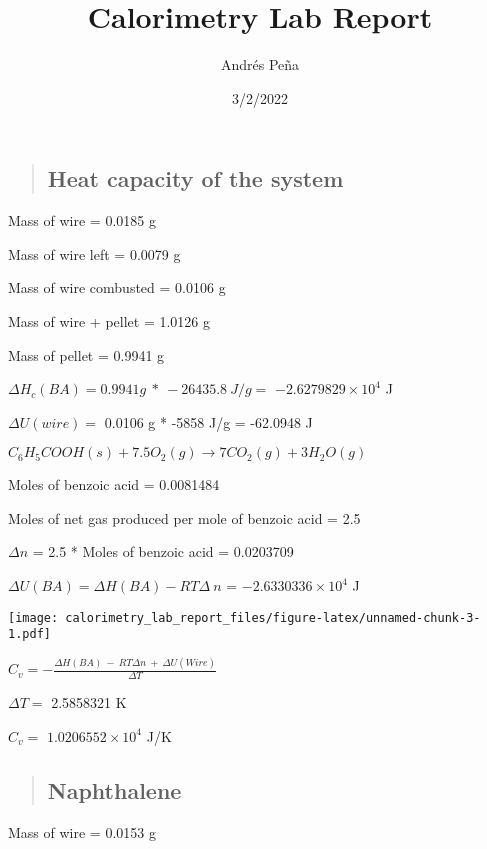 \documentclass[
]{article}
\title{Calorimetry Lab Report}
\author{Andrés Peña}
\date{3/2/2022}
\begin{document}
\maketitle

\begin{quote}
\hypertarget{heat-capacity-of-the-system}{%
\subsection{Heat capacity of the
system}\label{heat-capacity-of-the-system}}
\end{quote}

Mass of wire = 0.0185 g

Mass of wire left = 0.0079 g

Mass of wire combusted = 0.0106 g

Mass of wire + pellet = 1.0126 g

Mass of pellet = 0.9941 g

\(\Delta H_c (BA) = 0.9941g\ *\ -26435.8\ J/g =\)
\ensuremath{-2.6279829\times 10^{4}} J

\(\Delta U (wire) =\) 0.0106 g * -5858 J/g = -62.0948 J

\(C_6 H_5 COOH(s) + 7.5O_2 (g) \rightarrow 7CO_2(g) + 3H_2 O(g)\)

Moles of benzoic acid = 0.0081484

Moles of net gas produced per mole of benzoic acid = 2.5

\(\Delta n\) = 2.5 * Moles of benzoic acid = 0.0203709

\(\Delta U(BA) = \Delta H(BA) - RT \Delta\ n\) =
\ensuremath{-2.6330336\times 10^{4}} J

\texttt{[image: calorimetry\_lab\_report\_files/figure-latex/unnamed-chunk-3-1.pdf]}

\(C_v = -\frac{\Delta H(BA)\ -\ RT\Delta n\ +\ \Delta U (Wire)}{\Delta T}\)

\(\Delta T=\) 2.5858321 K

\(C_v=\) \ensuremath{1.0206552\times 10^{4}} J/K

\newpage

\begin{quote}
\hypertarget{naphthalene}{%
\subsection{Naphthalene}\label{naphthalene}}
\end{quote}

Mass of wire = 0.0153 g
\end{document}
